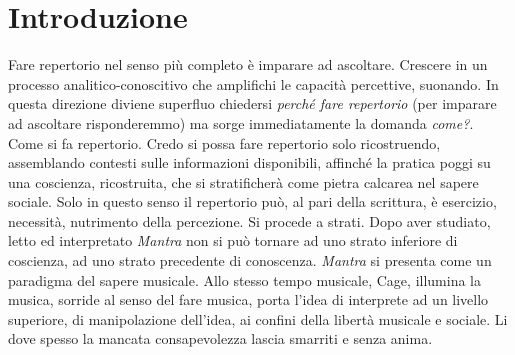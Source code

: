 

\chapter*{Introduzione}



Fare repertorio nel senso pi\`u completo \`e imparare ad ascoltare. Crescere in un processo analitico-conoscitivo che amplifichi le capacità percettive, suonando. In questa direzione diviene superfluo chiedersi \emph{perché fare repertorio} (per imparare ad ascoltare risponderemmo) ma sorge immediatamente la domanda \emph{come?}. Come si fa repertorio. Credo si possa fare repertorio solo ricostruendo, assemblando contesti sulle informazioni disponibili, affinch\'e la pratica poggi su una coscienza, ricostruita, che si stratificherà come pietra calcarea nel sapere sociale. Solo in questo senso il repertorio può, al pari della scrittura, è esercizio, necessità, nutrimento della percezione. Si procede a strati. Dopo aver studiato, letto ed interpretato \emph{Mantra} non si può tornare ad uno strato inferiore di coscienza, ad uno strato precedente di conoscenza. \emph{Mantra} si presenta come un paradigma del sapere musicale. Allo stesso tempo musicale, Cage, illumina la musica, sorride al senso del fare musica, porta l'idea di interprete ad un livello superiore, di manipolazione dell'idea, ai confini della libertà musicale e sociale. Li dove spesso la mancata consapevolezza lascia smarriti e senza anima.

